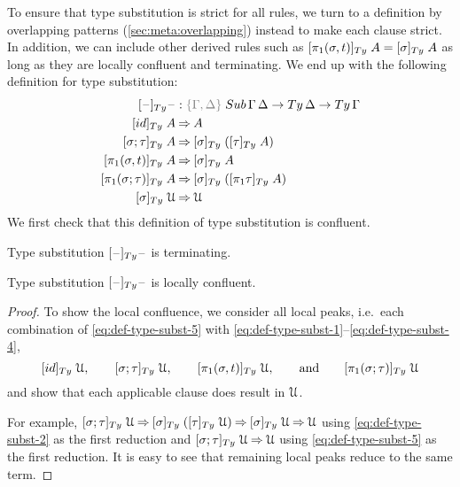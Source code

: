 \documentclass[a4paper,UKenglish,numberwithinsect,cleveref,thm-restate]{lipics-v2021}
\newcommand{\danger}{\marginpar[\hfill\dbend]{\dbend\hfill}}
\begin{document}
To ensure that type substitution is strict for all %
{rules}, we turn to a definition by overlapping patterns (\cref{sec:meta:overlapping}) instead to make each clause strict. 
In addition, we can include other derived rules such as $[\pi_1(\sigma, t)]_{\Ty}\;A = [ \sigma]_{\Ty}\;A$ as long as they are locally confluent and terminating.
We end up with the following definition for type substitution:
\begin{alignat}{3}
[\blank]_{\Ty} \blank            &: \implicit{\Gamma, \Delta} \; \Sub\,\Gamma\,\Delta \to \Ty\,\Delta \to \Ty\,\Gamma \nonumber \\
[ \idS ]_{\Ty}\;A                & \reduce A \label{eq:def-type-subst-1}\\
[ \sigma ; \tau ]_{\Ty}\;A       & \reduce [ \sigma ]_{\Ty}\;([ \tau ]_{\Ty}\;A) \label{eq:def-type-subst-2}\\
[ \pi_1(\sigma, t) ]_{\Ty}\;A    & \reduce [\sigma]_\Ty\;A                       \label{eq:def-type-subst-3} \\
[ \pi_1(\sigma; \tau) ]_{\Ty}\;A & \reduce [\sigma]_\Ty\;([\pi_1\tau]_\Ty\;A)    \label{eq:def-type-subst-4} \\
[ \sigma ]_{\Ty}\;\UU            & \reduce \UU                                   \label{eq:def-type-subst-5}
\end{alignat}
We first check that this definition of type substitution is confluent.
\begin{proposition}[Termination]
  Type substitution $[\blank]_{\Ty}\blank$ is terminating.
  \danger
\end{proposition}
\begin{proposition} \label{prop:local-confluence-1}
  Type substitution $[\blank]_{\Ty}\blank$ is locally confluent.
  \danger
\end{proposition}
\begin{proof}
  To show the local confluence, we consider all local peaks, i.e.\ each combination of \eqref{eq:def-type-subst-5} with \eqref{eq:def-type-subst-1}--\eqref{eq:def-type-subst-4},
  \[
    [\idS]_{\Ty}\;\UU, \qquad [\sigma;\tau]_{\Ty}\;\UU, \qquad [\pi_1(\sigma, t)]_{\Ty}\;\UU, \qquad\text{and}\qquad [\pi_1(\sigma; \tau)]_{\Ty}\;\UU
  \]
  and show that each applicable clause does result in $\mathcal{U}$.

  For example, $[\sigma;\tau]_{\Ty}\;\UU \reduce [\sigma]_{\Ty}\;([\tau]_{\Ty}\;\UU) \reduce [\sigma]_{\Ty}\;\UU \reduce \UU$ using \eqref{eq:def-type-subst-2} as the first reduction and $[\sigma;\tau]_{\Ty}\;\UU \reduce \UU$ using \eqref{eq:def-type-subst-5} as the first reduction.
  It is easy to see that remaining local peaks reduce to the same term.
\end{proof}
\end{document}
